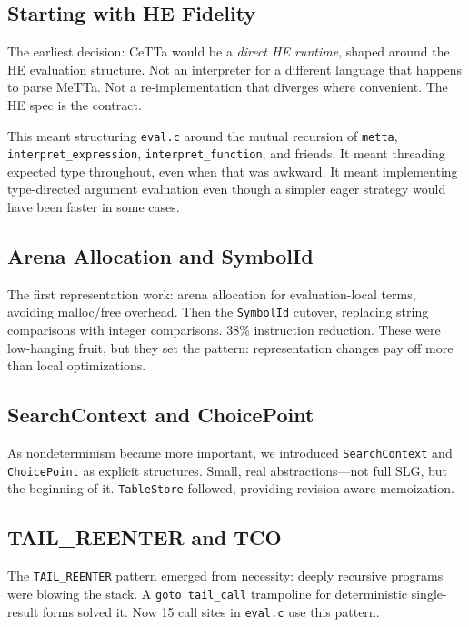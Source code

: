 \documentclass[11pt]{article}
\newcommand{\code}[1]{\texttt{#1}}
\newcommand{\HE}{\textup{HE}}
\newcommand{\CeTTa}{\textup{CeTTa}}
\begin{document}
\subsection{Starting with HE Fidelity}

The earliest decision: \CeTTa{} would be a \emph{direct \HE{} runtime},
shaped around the \HE{} evaluation structure.  Not an interpreter for
a different language that happens to parse MeTTa.  Not a re-implementation
that diverges where convenient.  The \HE{} spec is the contract.

This meant structuring \code{eval.c} around the mutual recursion of
\code{metta}, \code{interpret\_expression}, \code{interpret\_function},
and friends.  It meant threading expected type throughout, even when
that was awkward.  It meant implementing type-directed argument
evaluation even though a simpler eager strategy would have been faster
in some cases.

\subsection{Arena Allocation and SymbolId}

The first representation work: arena allocation for evaluation-local
terms, avoiding malloc/free overhead.  Then the \code{SymbolId} cutover,
replacing string comparisons with integer comparisons.  38\% instruction
reduction.  These were low-hanging fruit, but they set the pattern:
representation changes pay off more than local optimizations.

\subsection{SearchContext and ChoicePoint}

As nondeterminism became more important, we introduced
\code{SearchContext} and \code{ChoicePoint} as explicit structures.
Small, real abstractions---not full SLG, but the beginning of it.
\code{TableStore} followed, providing revision-aware memoization.

\subsection{TAIL\_REENTER and TCO}

The \code{TAIL\_REENTER} pattern emerged from necessity: deeply recursive
programs were blowing the stack.  A \code{goto tail\_call} trampoline
for deterministic single-result forms solved it.  Now 15 call sites
in \code{eval.c} use this pattern.
\end{document}
